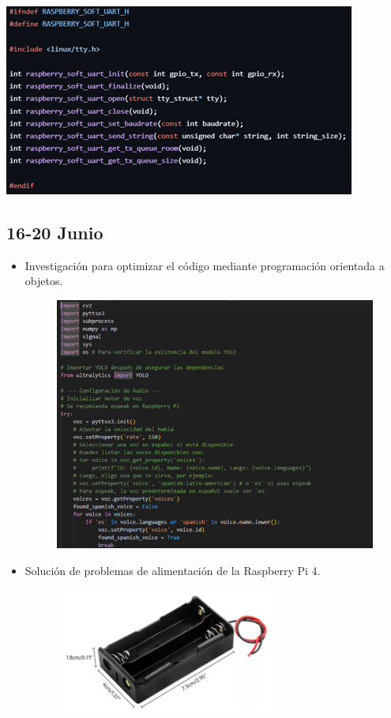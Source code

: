 \documentclass[12pt,a4paper]{article}
\begin{document}
\includegraphics[width=0.7\linewidth]{Carpeta de campo/Imagen13.png}

\subsection*{16-20 Junio}

\begin{itemize}
\item Investigación para optimizar el código mediante programación orientada a objetos.
\begin{figure}[H]
    \centering
    \includegraphics[width=0.7\linewidth]{Carpeta de campo/Imagen14.png}
\end{figure}



\item Solución de problemas de alimentación de la Raspberry Pi 4.
\begin{figure}[H]
\centering
\includegraphics[width=0.5\linewidth]{Carpeta de campo/Imagen15.png}
\end{figure}
\end{itemize}
\end{document}
